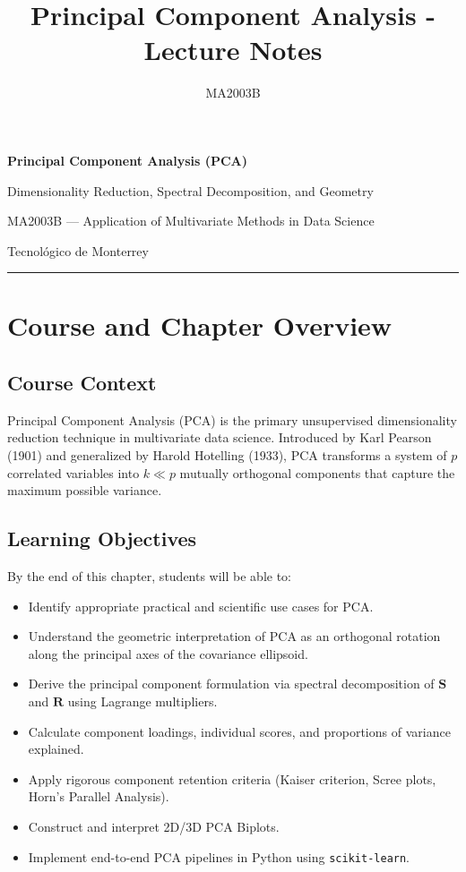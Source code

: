 \documentclass[
]{article}
\title{Principal Component Analysis - Lecture Notes}
\author{MA2003B}
\date{}
\begin{document}
\maketitle

\textbf{Principal Component Analysis (PCA)}

Dimensionality Reduction, Spectral Decomposition, and Geometry

MA2003B --- Application of Multivariate Methods in Data Science

Tecnológico de Monterrey

\begin{center}\rule{0.5\linewidth}{0.5pt}\end{center}

\textbf{ }

\section{Course and Chapter Overview}

\textbf{ }

\subsection{Course Context}

Principal Component Analysis (PCA) is the primary unsupervised
dimensionality reduction technique in multivariate data science.
Introduced by Karl Pearson (1901) and generalized by Harold Hotelling
(1933), PCA transforms a system of \(p\) correlated variables into
\(k \ll p\) mutually orthogonal components that capture the maximum
possible variance.

\textbf{ }

\subsection{Learning Objectives}

By the end of this chapter, students will be able to:

\begin{itemize}
\item
  Identify appropriate practical and scientific use cases for PCA.
\item
  Understand the geometric interpretation of PCA as an orthogonal
  rotation along the principal axes of the covariance ellipsoid.
\item
  Derive the principal component formulation via spectral decomposition
  of \(\mathbf{S}\) and \(\mathbf{R}\) using Lagrange multipliers.
\item
  Calculate component loadings, individual scores, and proportions of
  variance explained.
\item
  Apply rigorous component retention criteria (Kaiser criterion, Scree
  plots, Horn's Parallel Analysis).
\item
  Construct and interpret 2D/3D PCA Biplots.
\item
  Implement end-to-end PCA pipelines in Python using
  \texttt{scikit-learn}.
\end{itemize}
\end{document}

